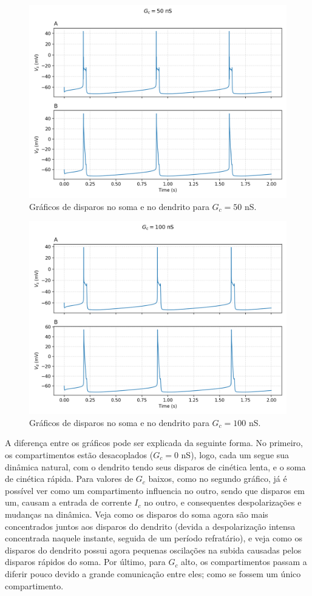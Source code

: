 \documentclass[english,11pt,a4paper]{article}
\begin{document}
	\begin{figure}[H]
		\centering
		\includegraphics[width=12cm]{../figures/ex_3_gc50.png}
		\caption{Gráficos de disparos no soma e no dendrito para $G_c = 50$ nS.}
	\end{figure}
	
	\begin{figure}[H]
		\centering
		\includegraphics[width=12cm]{../figures/ex_3_gc100.png}
		\caption{Gráficos de disparos no soma e no dendrito para $G_c = 100$ nS.}
	\end{figure}
	
	A diferença entre os gráficos pode ser explicada da seguinte forma. No primeiro, os compartimentos estão desacoplados ($G_c = 0$ nS), logo, cada um segue sua dinâmica natural, com o dendrito tendo seus disparos de cinética lenta, e o soma de cinética rápida. Para valores de $G_c$ baixos, como no segundo gráfico, já é possível ver como um compartimento influencia no outro, sendo que disparos em um, causam a entrada de corrente $I_c$ no outro, e consequentes despolarizações e mudanças na dinâmica. Veja como os disparos do soma agora são mais concentrados juntos aos disparos do dendrito (devida a despolarização intensa concentrada naquele instante, seguida de um período refratário), e veja como os disparos do dendrito possui agora pequenas oscilações na subida causadas pelos disparos rápidos do soma. Por último, para $G_c$ alto, os compartimentos passam a diferir pouco devido a grande comunicação entre eles; como se fossem um único compartimento.\\\\
	
\end{document}
